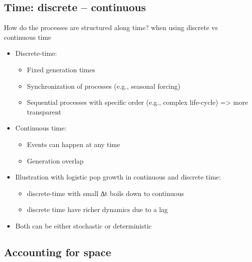 \documentclass[
]{book}
\providecommand{\tightlist}{%
  \setlength{\itemsep}{0pt}\setlength{\parskip}{0pt}}
\theoremstyle{definition}
\theoremstyle{definition}
\theoremstyle{definition}
\theoremstyle{definition}
\theoremstyle{remark}
\begin{document}
\subsection{Time: discrete -- continuous}\label{time-discrete-continuous}

How do the processes are structured along time? when using discrete vs continuous time

\begin{itemize}
\tightlist
\item
  Discrete-time:

  \begin{itemize}
  \tightlist
  \item
    Fixed generation times
  \item
    Synchronization of processes (e.g., seasonal forcing)
  \item
    Sequential processes with specific order (e.g., complex life-cycle) =\textgreater{} more transparent
  \end{itemize}
\item
  Continuous time:

  \begin{itemize}
  \tightlist
  \item
    Events can happen at any time
  \item
    Generation overlap
  \end{itemize}
\item
  Illustration with logistic pop growth in continuous and discrete time:

  \begin{itemize}
  \tightlist
  \item
    discrete-time with small ∆t boils down to continuous
  \item
    discrete time have richer dynamics due to a lag
  \end{itemize}
\item
  Both can be either stochastic or deterministic
\end{itemize}

\subsection{Accounting for space}\label{accounting-for-space}
\end{document}
